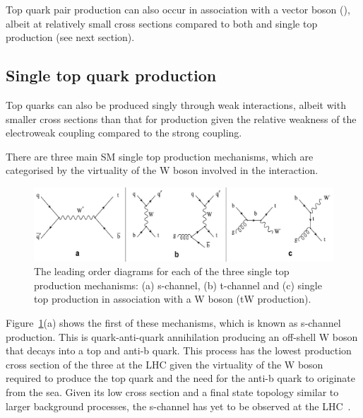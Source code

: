 Top quark pair production can also occur in association with a vector boson (\ttV), albeit at relatively small cross sections compared to both \ttbar and single top production (see next section).

\subsection{Single top quark production}\label{subsec:singleTopTheory}
Top quarks can also be produced singly through weak interactions, albeit with smaller cross sections than that for \ttbar production given the relative weakness of the electroweak coupling compared to the strong coupling.

There are three main SM single top production mechanisms, which are categorised by the virtuality of the W boson involved in the interaction.

\begin{figure}[htbp]
\centering
\includegraphics[width=1.00\textwidth]{figs/top-physics/singletop_feyn.jpg}
\caption{The leading order diagrams for each of the three single top production mechanisms: (a) s-channel, (b) t-channel and (c) single top production in association with a W boson (tW production).}
\label{fig:singleTopDiagrams}
\end{figure}

Figure~\ref{fig:singleTopDiagrams}(a) shows the first of these mechanisms, which is known as s-channel production. 
This is quark-anti-quark annihilation producing an off-shell W boson that decays into a top and anti-b quark.
This process has the lowest production cross section of the three at the LHC given the virtuality of the W boson required to produce the top quark and the need for the anti-b quark to originate from the sea.
Given its low cross section and a final state topology similar to larger background processes, the s-channel has yet to be observed at the LHC~\cite{Khachatryan:2016ewo}.

